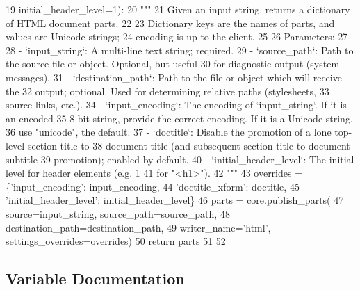 \begin{DoxyCode}
19                initial\_header\_level=1):
20     \textcolor{stringliteral}{"""}
21 \textcolor{stringliteral}{    Given an input string, returns a dictionary of HTML document parts.}
22 \textcolor{stringliteral}{}
23 \textcolor{stringliteral}{    Dictionary keys are the names of parts, and values are Unicode strings;}
24 \textcolor{stringliteral}{    encoding is up to the client.}
25 \textcolor{stringliteral}{}
26 \textcolor{stringliteral}{    Parameters:}
27 \textcolor{stringliteral}{}
28 \textcolor{stringliteral}{    - `input\_string`: A multi-line text string; required.}
29 \textcolor{stringliteral}{    - `source\_path`: Path to the source file or object.  Optional, but useful}
30 \textcolor{stringliteral}{      for diagnostic output (system messages).}
31 \textcolor{stringliteral}{    - `destination\_path`: Path to the file or object which will receive the}
32 \textcolor{stringliteral}{      output; optional.  Used for determining relative paths (stylesheets,}
33 \textcolor{stringliteral}{      source links, etc.).}
34 \textcolor{stringliteral}{    - `input\_encoding`: The encoding of `input\_string`.  If it is an encoded}
35 \textcolor{stringliteral}{      8-bit string, provide the correct encoding.  If it is a Unicode string,}
36 \textcolor{stringliteral}{      use "unicode", the default.}
37 \textcolor{stringliteral}{    - `doctitle`: Disable the promotion of a lone top-level section title to}
38 \textcolor{stringliteral}{      document title (and subsequent section title to document subtitle}
39 \textcolor{stringliteral}{      promotion); enabled by default.}
40 \textcolor{stringliteral}{    - `initial\_header\_level`: The initial level for header elements (e.g. 1}
41 \textcolor{stringliteral}{      for "<h1>").}
42 \textcolor{stringliteral}{    """}
43     overrides = \{\textcolor{stringliteral}{'input\_encoding'}: input\_encoding,
44                  \textcolor{stringliteral}{'doctitle\_xform'}: doctitle,
45                  \textcolor{stringliteral}{'initial\_header\_level'}: initial\_header\_level\}
46     parts = core.publish\_parts(
47         source=input\_string, source\_path=source\_path,
48         destination\_path=destination\_path,
49         writer\_name=\textcolor{stringliteral}{'html'}, settings\_overrides=overrides)
50     \textcolor{keywordflow}{return} parts
51 
52 
\end{DoxyCode}


\subsection{Variable Documentation}
\hypertarget{namespacesoftware_1_1chipwhisperer_1_1common_1_1ui_1_1HelpWindow_aa332a61a44fd34a5b42551efb342cc0c}{}
